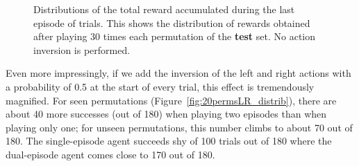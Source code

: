 \begin{figure}
	\centering
	\caption{Distributions of the total reward accumulated during the last
	episode of trials. This shows the distribution of rewards obtained
	after playing 30 times each permutation of the \textbf{test} set. No action
	inversion is performed.}
	\label{fig:20perms_unseen_distrib}
\end{figure}

Even more impressingly, if we add the inversion of the left and right actions
with a probability of 0.5 at the start of every trial, this effect is
tremendously magnified. For seen permutations
(Figure~\ref{fig:20permsLR_distrib}), there are about 40 more successes (out of
180) when playing two episodes than when playing only one; for unseen
permutations, this number climbs to about 70 out of 180. The single-episode
agent succeeds shy of 100 trials out of 180 where the dual-episode agent
comes close to 170 out of 180.\\


